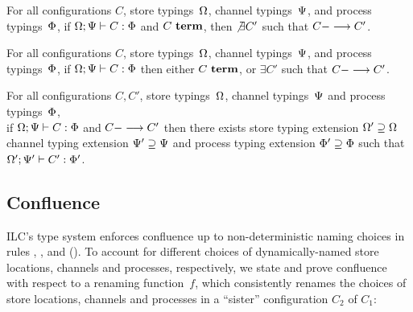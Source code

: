 
\begin{lemma}
For all configurations $C$,
store typings~$\Omega$,
channel typings~$\Psi$,
and process typings~$\Phi$,
%
if $\Omega ; \Psi |- C : \Phi$
and $C~\textbf{term}$,
then $\not\exists C'$ such that $C ---> C'$.
\end{lemma}


\begin{theorem}[Progress]
For all configurations $C$,
store typings~$\Omega$,
channel typings~$\Psi$,
and process typings~$\Phi$,
%
if $\Omega ; \Psi |- C : \Phi$
then 
either $C~\textbf{term}$,
or $\exists C'$ such that $C ---> C'$.
\end{theorem}

\begin{theorem}[Preservation]
For all configurations $C, C'$,
store typings~$\Omega$,
channel typings~$\Psi$
and process typings~$\Phi$,
\\
%
 if $\Omega ; \Psi |- C : \Phi$
and $C ---> C'$ 
then there exists 
store typing extension $\Omega' \supseteq \Omega$
channel typing extension $\Psi' \supseteq \Psi$
and process typing extension $\Phi' \supseteq \Phi$
such that $\Omega' ; \Psi' |- C' : \Phi'$.
\end{theorem}


\subsection{Confluence}

ILC's type system enforces confluence 
up to non-deterministic naming choices in 
rules , , and  ().
%
To account for different choices of dynamically-named
store locations, channels and processes, respectively, 
we state and prove confluence
with respect to a renaming function~$f$, which consistently renames
the choices of store locations, channels and processes in 
a ``sister'' configuration $C_2$ of $C_1$:

